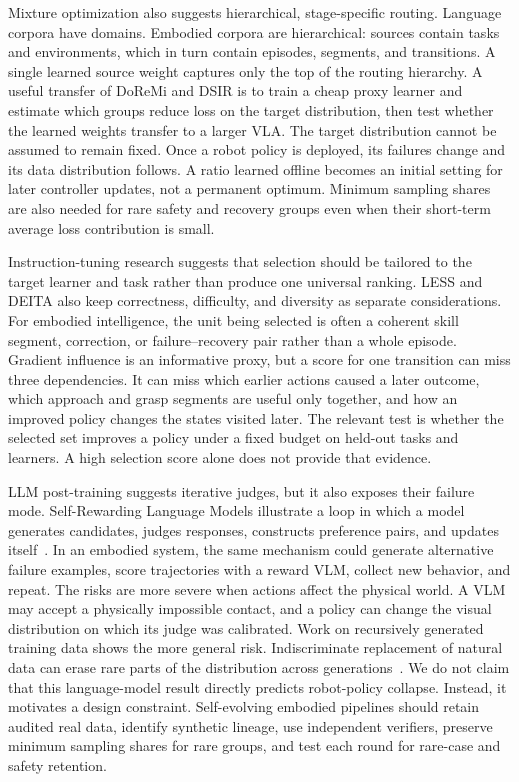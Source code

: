 Mixture optimization also suggests hierarchical, stage-specific routing.
Language corpora have domains.
Embodied corpora are hierarchical: sources contain tasks and environments, which in turn contain episodes, segments, and transitions.
A single learned source weight captures only the top of the routing hierarchy.
A useful transfer of DoReMi and DSIR is to train a cheap proxy learner and estimate which groups reduce loss on the target distribution, then test whether the learned weights transfer to a larger VLA.
The target distribution cannot be assumed to remain fixed.
Once a robot policy is deployed, its failures change and its data distribution follows.
A ratio learned offline becomes an initial setting for later controller updates, not a permanent optimum.
Minimum sampling shares are also needed for rare safety and recovery groups even when their short-term average loss contribution is small.

Instruction-tuning research suggests that selection should be tailored to the target learner and task rather than produce one universal ranking.
LESS and DEITA also keep correctness, difficulty, and diversity as separate considerations.
For embodied intelligence, the unit being selected is often a coherent skill segment, correction, or failure--recovery pair rather than a whole episode.
Gradient influence is an informative proxy, but a score for one transition can miss three dependencies.
It can miss which earlier actions caused a later outcome, which approach and grasp segments are useful only together, and how an improved policy changes the states visited later.
The relevant test is whether the selected set improves a policy under a fixed budget on held-out tasks and learners.
A high selection score alone does not provide that evidence.

LLM post-training suggests iterative judges, but it also exposes their failure mode.
Self-Rewarding Language Models illustrate a loop in which a model generates candidates, judges responses, constructs preference pairs, and updates itself~\cite{yuan2024self_2401_10020}.
In an embodied system, the same mechanism could generate alternative failure examples, score trajectories with a reward VLM, collect new behavior, and repeat.
The risks are more severe when actions affect the physical world.
A VLM may accept a physically impossible contact, and a policy can change the visual distribution on which its judge was calibrated.
Work on recursively generated training data shows the more general risk.
Indiscriminate replacement of natural data can erase rare parts of the distribution across generations~\cite{shumailov2024collapse}.
We do not claim that this language-model result directly predicts robot-policy collapse.
Instead, it motivates a design constraint.
Self-evolving embodied pipelines should retain audited real data, identify synthetic lineage, use independent verifiers, preserve minimum sampling shares for rare groups, and test each round for rare-case and safety retention.

